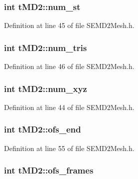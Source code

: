 \subsubsection[{num\+\_\+st}]{\setlength{\rightskip}{0pt plus 5cm}int t\+M\+D2\+::num\+\_\+st}\label{structt_m_d2_a040262cc1e9b86014861f3f9f8cef859}


Definition at line 45 of file S\+E\+M\+D2\+Mesh.\+h.

\subsubsection[{num\+\_\+tris}]{\setlength{\rightskip}{0pt plus 5cm}int t\+M\+D2\+::num\+\_\+tris}\label{structt_m_d2_a1f1189759453022f31c6ddf3d93ea2ad}


Definition at line 46 of file S\+E\+M\+D2\+Mesh.\+h.

\subsubsection[{num\+\_\+xyz}]{\setlength{\rightskip}{0pt plus 5cm}int t\+M\+D2\+::num\+\_\+xyz}\label{structt_m_d2_a21bd4d87e73c4e4e22aff8f10a4355e8}


Definition at line 44 of file S\+E\+M\+D2\+Mesh.\+h.

\subsubsection[{ofs\+\_\+end}]{\setlength{\rightskip}{0pt plus 5cm}int t\+M\+D2\+::ofs\+\_\+end}\label{structt_m_d2_a2782aa3e08813d57ffdef256455e8dfb}


Definition at line 55 of file S\+E\+M\+D2\+Mesh.\+h.

\subsubsection[{ofs\+\_\+frames}]{\setlength{\rightskip}{0pt plus 5cm}int t\+M\+D2\+::ofs\+\_\+frames}\label{structt_m_d2_a0faf28206e1ad9127a5ccbca0f35430a}


